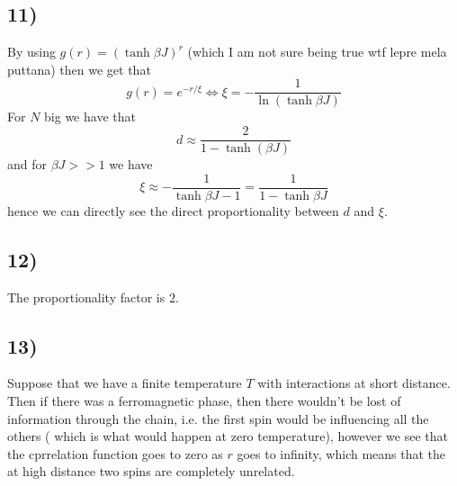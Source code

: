 \documentclass[10pt,a4paper]{book}
\begin{document}
\subsection*{11)}
By using $g(r)=(\tanh\beta J)^r$ (which I am not sure being true wtf lepre mela puttana) then we get that 
$$g(r)=e^{-r/\xi}\Leftrightarrow \xi=-\frac{1}{\ln(\tanh\beta J)}$$
For $N$ big we have that 
$$d\approx \frac{2}{1-\tanh(\beta J)}$$
and for $\beta J>>1$ we have
$$\xi\approx -\frac{1}{\tanh\beta J-1}=\frac{1}{1-\tanh\beta J}$$
hence we can directly see the direct proportionality between $d$ and $\xi$. 

\subsection*{12)}

The proportionality factor is $2$. 

\subsection*{13)}
Suppose that we have a finite temperature $T$ with interactions at short distance. Then if there was a ferromagnetic phase, then there wouldn't be lost of information through the chain, i.e. the first spin would be influencing all the others ( which is what would happen at zero temperature), however we see that the cprrelation function goes to zero as $r$ goes to infinity, which means that the at high distance two spins are completely unrelated.
\end{document}
